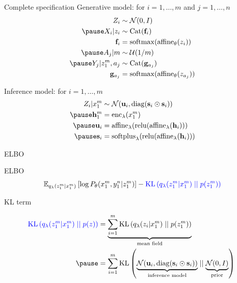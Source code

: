 \begin{frame}[plain]{Complete specification}
Generative model: for $i=1, \ldots, m$ and $j=1, \ldots, n$ \pause
\begin{equation*}
\begin{aligned}
Z_i &\sim \mathcal N(0, I) \\ \pause
X_i|z_i &\sim \Cat(\mathbf f_i) \\ 
\mathbf f_i &= \softmax(\affine_\theta(z_i)) \\ \pause
A_j|m &\sim \mathcal U(1/m) \\ \pause
Y_j|z_1^m, a_j &\sim \Cat(\mathbf g_{a_j}) \\
\mathbf g_{a_j} &= \softmax(\affine_\theta(z_{a_j}))
\end{aligned}
\end{equation*}

Inference model: for $i=1, \ldots, m$ \pause
\begin{equation*}
\begin{aligned}
Z_i|x_1^m &\sim \mathcal N(\mathbf u_i, \diag(\mathbf s_i \odot \mathbf s_i))\\ \pause
\mathbf h_1^m &= \text{enc}_\lambda(x_1^m) \\ \pause
\mathbf u_i &= \text{affine}_\lambda(\relu(\text{affine}_\lambda(\mathbf h_i)))\\ \pause
\mathbf s_i &= \softplus_\lambda(\relu(\text{affine}_\lambda(\mathbf h_i))) 
\end{aligned}
\end{equation*}

\end{frame}

\begin{frame}{ELBO}

ELBO
\begin{equation*}
\begin{aligned}
\mathbb E_{q_\lambda(z_1^m|x_1^m)}\left[ \log P_\theta(x_1^m, y_1^n|z_1^m)\right] - \textcolor{blue}{\operatorname{KL}\left(q_\lambda(z_1^m|x_1^m)\mid\mid p(z_1^m)\right) }
\end{aligned}
\end{equation*}

\pause

KL term
\begin{small}
\begin{equation*}
\begin{aligned}
\textcolor{blue}{\KL{q_\lambda(z_1^m|x_1^m)}{p(z)} }
&= \underbrace{\sum_{i=1}^m \KL{q_\lambda(z_i|x_1^m)}{p(z_1^m)}}_{\text{mean field}} \\ \pause
&= \sum_{i=1}^m \KL{\underbrace{\mathcal N(\mathbf u_i, \diag(\mathbf s_i \odot \mathbf s_i))}_{\text{inference model}}}{\underbrace{\mathcal N(0, I)}_{\text{prior}}} \
\end{aligned}
\end{equation*}
\end{small}


\end{frame}

